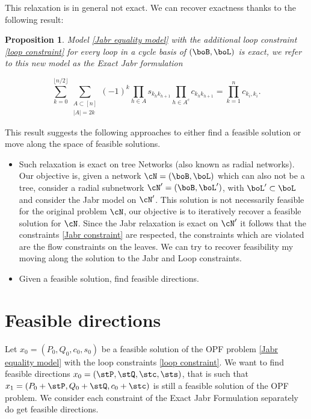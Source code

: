 \documentclass{article}
\newtheorem{prop}[theorem]{Proposition}
\begin{document}
This relaxation is in general not exact. We can recover exactness thanks to the following result:
\begin{prop}
  Model \eqref{Jabr equality model} with the additional \emph{loop constraint} \eqref{loop constraint} for every loop in a cycle basis of \((\boB,\boL)\) is exact, we refer to this new model as the \emph{Exact Jabr formulation}

  \begin{equation}
    \label{loop constraint}
    \sum_{k = 0}^{\lfloor n/2 \rfloor}\sum_{\substack{A \subset [n]\\|A|=2k}}(-1)^k\prod_{h \in A}s_{k_hk_{h+1}}\prod_{h \in A^c}c_{k_hk_{h+1}}=\prod_{k=1}^nc_{k_i,k_i}.
  \end{equation}
  \end{prop}
This result suggests the following approaches to either find a feasible solution or move along the space of feasible solutions.
\begin{itemize}
  \item Such relaxation is exact on tree Networks (also known as radial networks). Our objective is, given a network \(\cN = (\boB,\boL)\) which can also not be a tree, consider a radial subnetwork \(\cN' = (\boB,\boL')\), with \(\boL' \subset \boL \) and consider the Jabr model  on \(\cN'\).
  This solution is not necessarily feasible for the original problem \(\cN\), our objective is to iteratively recover a feasible solution for \(\cN\). 
  \vspace{1cm}
  Since the Jabr relaxation is exact on \(\cN'\) it follows that the constraints \ref{Jabr constraint} are respected, the constraints which are violated are the flow constraints on the leaves. We can try to recover feasibility my moving along the solution to the Jabr and Loop constraints.
  \item Given a feasible solution, find feasible directions.
\end{itemize}

\section{Feasible directions}

Let \(x_0 = (P_0,Q_0,c_0,s_0)\) be a feasible solution of the OPF problem \eqref{Jabr equality model} with the loop constraints \eqref{loop constraint}.
We want to find feasible directions \(x_0 = (\stP,\stQ,\stc,\sts)\), that is such that \(x_1 = (P_0+\stP,Q_0+\stQ,c_0+\stc)\) is still a feasible solution of the OPF problem.
We consider each constraint of the Exact Jabr Formulation separately do get feasible directions.
\end{document}
